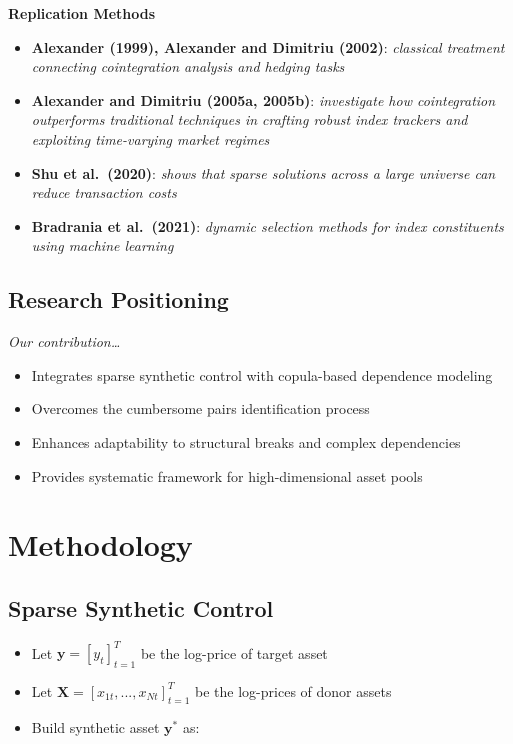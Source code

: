 \documentclass[
  letterpaper,
  DIV=11,
  numbers=noendperiod]{scrartcl}
\providecommand{\tightlist}{%
  \setlength{\itemsep}{0pt}\setlength{\parskip}{0pt}}\usepackage{longtable,booktabs,array}
\begin{document}
{\textbf{Replication Methods}}

\begin{itemize}
\tightlist
\item
  \textbf{Alexander (1999), Alexander and Dimitriu (2002)}:
  \emph{classical treatment connecting cointegration analysis and
  hedging tasks}
\item
  \textbf{Alexander and Dimitriu (2005a, 2005b)}: \emph{investigate how
  cointegration outperforms traditional techniques in crafting robust
  index trackers and exploiting time-varying market regimes}
\item
  \textbf{Shu et al.~(2020)}: \emph{shows that sparse solutions across a
  large universe can reduce transaction costs}
\item
  \textbf{Bradrania et al.~(2021)}: \emph{dynamic selection methods for
  index constituents using machine learning}
\end{itemize}

\subsection{Research Positioning}\label{research-positioning}

\emph{Our contribution\ldots{}}

\begin{itemize}
\tightlist
\item
  Integrates sparse synthetic control with copula-based dependence
  modeling
\item
  Overcomes the cumbersome pairs identification process
\item
  Enhances adaptability to structural breaks and complex dependencies
\item
  Provides systematic framework for high-dimensional asset pools
\end{itemize}

\section{Methodology}\label{methodology}

\subsection{Sparse Synthetic Control}\label{sparse-synthetic-control}

\begin{itemize}
\tightlist
\item
  Let \(\mathbf{y} = [y_t]_{t=1}^T\) be the log-price of target asset
\item
  Let \(\mathbf{X} = [x_{1t}, ..., x_{Nt}]_{t=1}^T\) be the log-prices
  of donor assets
\item
  Build synthetic asset \(\mathbf{y}^*\) as:
\end{itemize}
\end{document}
